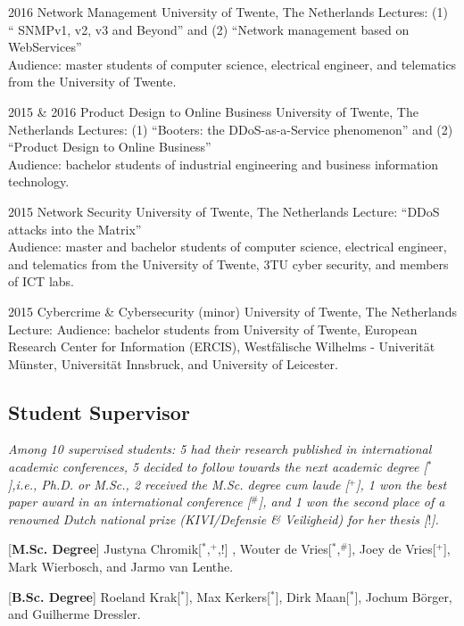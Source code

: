 \documentclass[print]{styles/friggeri-cv-linux} %
\begin{document}
\begin{entrylist}
\entry
{2016}
{Network Management}
{University of Twente, The Netherlands}
{Lectures: (1) `` SNMPv1, v2, v3 and Beyond'' and (2) ``Network management based
	on WebServices''\\
Audience: master students of computer science, electrical engineer, and
telematics from the University of Twente. }

\entry
{2015 \& 2016}
{Product Design to Online Business}
{University of Twente, The Netherlands}
{Lectures: (1) ``Booters: the DDoS-as-a-Service phenomenon'' and (2) ``Product
Design to Online Business''\\ Audience: bachelor students of industrial
engineering and business information technology.}

\entry
{2015}
{Network Security}
{University of Twente, The Netherlands}
{Lecture: ``DDoS attacks into the Matrix''\\
Audience: master and bachelor students of computer science, electrical engineer,
and telematics from the University of Twente, 3TU cyber security, and members of
ICT labs. }

\entry
{2015}
{Cybercrime \& Cybersecurity (minor)}
{University of Twente, The Netherlands}
{Lecture: 
Audience: bachelor students from University of Twente, European Research Center
for Information (ERCIS), Westfälische Wilhelms - Univerität Münster, Universität
Innsbruck, and University of Leicester. } \end{entrylist}

\subsection{Student Supervisor}\vspace{-5pt}

\textit{Among 10 supervised students: 5 had their research published in
international academic conferences, 5 decided to follow towards the next
academic degree [$^*$],i.e., Ph.D. or M.Sc., 2 received the M.Sc. degree
\textit{cum laude} [$^+$], 1 won the best paper award in an international
conference [$^\#$], and 1 won the second place of a renowned Dutch national
prize (KIVI/Defensie \& Veiligheid) for her thesis [$!$].}

\begin{entrylist}
\vspace{-0.3cm}
\entry
{[\textbf{M.Sc. Degree}]}
{\textnormal{Justyna Chromik[$^*$,$^+$,$!$] , Wouter de Vries[$^*$,$^\#$], Joey de
Vries[$^+$], Mark Wierbosch, and Jarmo van Lenthe.}}
{}

\vspace{-0.3cm}
\entry
{[\textbf{B.Sc. Degree}]}
{\textnormal{Roeland Krak[$^*$], Max Kerkers[$^*$], Dirk Maan[$^*$], Jochum Börger, and
Guilherme Dressler.}} 
{}

\end{entrylist}
\end{document}
